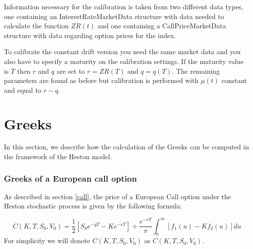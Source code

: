 Information necessary for the calibration is taken from two different data types, one containing an InterestRateMarketData  structure with data needed to calculate the function $ZR(t)$ and one containing a CallPriceMarketData structure with data regarding option prices for the index.

To calibrate the constant drift version you need the same market data and you also have to specify a maturity on the calibration settings. If the maturity value is $T$ then $r$ and $q$ are set to $r = ZR(T)$ and $q = q(T)$. The remaining parameters are found as before but calibration is performed with $\mu(t)$ constant and equal to $r-q$.




\section{Greeks}
In this section, we describe how the calculation of the Greeks can be computed in the framework of the Heston model. 


\subsubsection{Greeks of a European call option}
As described in section \ref{call}, the price of a European Call option under the Heston stochastic process is given by the following formula:

$$
C(K,T, S_0, V_0) = \frac{1}{2}\left[S_0e^{-q T} - Ke^{-r T}\right] + \frac{e^{-r T}}{\pi}\int_0^{\infty}\left[f_1(u) - Kf_2(u)\right]du
$$
For simplicity we will denote $C(K,T, S_0, V_0)$ as $C(K,T, S_0, V_0)$.

